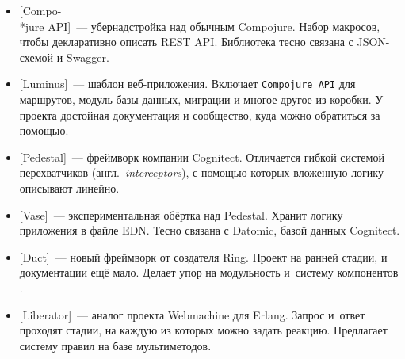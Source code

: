 \begin{itemize}


\item
  [Compo-\\*jure API]~---
  убернадстройка над обычным Compojure. Набор макросов, чтобы декларативно описать REST
  API. Библиотека тесно связана с JSON-схемой и Swagger.


\item
  [Luminus]~--- шаблон
  веб-приложения. Включает \texttt{Compojure API} для маршрутов, модуль базы
  данных, миграции и многое другое из коробки. У проекта достойная документация
  и сообщество, куда можно обратиться за помощью.


\item
  [Pedestal]~--- фреймворк
  компании Cognitect. Отличается гибкой системой перехватчиков
  (англ.~\emph{interceptors}), с помощью которых вложенную логику описывают
  линейно.


\item
  [Vase]~---
  экспериментальная обёртка над Pedestal. Хранит логику приложения в файле
  EDN. Тесно связана с Datomic, базой данных Cognitect.


\item
  [Duct]~--- новый
  фреймворк от создателя Ring. Проект на ранней стадии, и документации ещё
  мало. Делает упор на модульность и~систему компонентов .


\item
  [Liberator]~---
  аналог проекта Webmachine для Erlang. Запрос и~ответ проходят стадии, на
  каждую из которых можно задать реакцию. Предлагает систему правил на базе
  мультиметодов.

\end{itemize}

